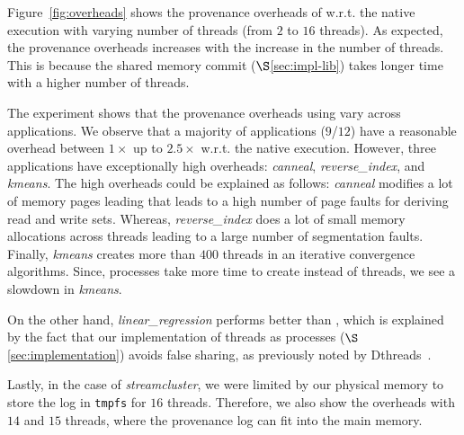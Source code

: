  Figure~\ref{fig:overheads} shows the provenance overheads of \projecttitle w.r.t. the native \pthreads execution with varying number of
threads (from $2$ to $16$ threads). As expected, the provenance overheads increases with the increase in the number of threads. This is because the shared memory commit ($\S$\ref{sec:impl-lib}) takes longer time with a higher number of threads. 

The experiment shows that the provenance overheads using \projecttitle vary across applications. 
We observe that a majority of applications ($9$/$12$) have a reasonable overhead between $1\times$ up to $2.5\times$ w.r.t. the native execution. However, three applications have exceptionally high overheads:  {\em canneal}, {\em reverse\_index}, and {\em kmeans}. The high overheads could be explained as follows: {\em canneal} modifies a lot of memory pages leading that leads to a high number of page faults for deriving read and write sets. Whereas, {\em reverse\_index} does a lot of small memory allocations across threads leading to a large number of segmentation faults.  Finally, {\em kmeans} creates more than $400$ threads in an iterative convergence algorithms. Since, processes take more time to create instead of threads, we see a slowdown in {\em kmeans}.


On the other hand, {\em linear\_regression} performs better than \pthreads, which is explained by the fact that our implementation of threads as processes ($\S$\ref{sec:implementation})  avoids false sharing, as previously noted by Dthreads~\cite{dthreads-sosp-2011}.



Lastly, in the case of {\em streamcluster}, we were limited by our physical memory to store the log in {\tt tmpfs} for $16$ threads. Therefore, we also show the overheads with $14$ and $15$ threads,  where the provenance log can fit into the main memory.  %



%

